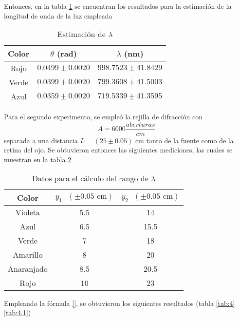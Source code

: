 \documentclass[12pt,a4paper]{article}
\begin{document}
	 Entonces, en la tabla \ref{tab:2} se encuentran los resultados para la estimación de la longitud de onda de la luz empleada
	 
	 \begin{table}[!htb]
	 	\centering
	 	\caption{Estimación de $ \lambda $}
	 	\begin{tabular}{|c|c|c|}
	 		\hline
	 		Color & $ \theta $ (rad) & $ \lambda $ (nm)\\
	 		\hline
	 		Rojo & $ 0.0499\pm 0.0020 $ & $ 998.7523\pm 41.8429 $ \\
	 		\hline
	 		Verde & $ 0.0399\pm 0.0020 $ & $ 799.3608\pm 41.5003 $ \\
	 		\hline
	 		Azul & $ 0.0359\pm 0.0020 $ & $ 719.5339\pm 41.3595 $ \\
	 		\hline
	 	\end{tabular}
 		\label{tab:2}
	 \end{table}
	 
	 
	 Para el segundo experimento, se empleó la rejilla de difracción con 
	 $$ A=6000\dfrac{aberturas}{cm} $$ separada a una distancia $ L=(25\pm0.05)\mbox{ cm} $ tanto de la fuente como de la retina del ojo. Se obtuvieron entonces las siguientes mediciones, las cuales se muestran en la tabla \ref{tab:3}
	 
	 \begin{table}[!htb]
	 	\centering
	 	\caption{Datos para el cálculo del rango de $ \lambda $}
	 	\begin{tabular}{|c|c|c|}
	 		\hline
	 		Color & $ y_1\mbox{ }(\pm0.05\mbox{ cm})$ & $ y_2\mbox{ }(\pm0.05\mbox{ cm})$ \\ \hline
	 		Violeta    & 5.5 & 14   \\ \hline
	 		Azul       & 6.5 & 15.5 \\ \hline
	 		Verde      & 7   & 18   \\ \hline
	 		Amarillo   & 8   & 20   \\ \hline
	 		Anaranjado & 8.5 & 20.5 \\ \hline
	 		Rojo       & 10  & 23   \\ \hline
	 	\end{tabular}
	 	\label{tab:3}
	 \end{table}
	 
	 Empleando la fórmula \ref{}, se obtuvieron los siguientes resultados (tabla \ref{tab:4} \ref{tab:4.1})
	 
\end{document}
